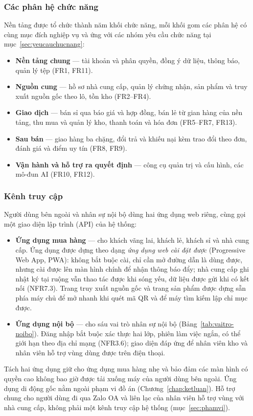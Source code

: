 \subsubsection*{Các phân hệ chức năng}

Nền tảng được tổ chức thành năm khối chức năng, mỗi khối gom các phân hệ có cùng mục đích nghiệp vụ và ứng với các nhóm yêu cầu chức năng tại mục~\ref{sec:yeucauchucnang}:

\begin{itemize}
    \item \textbf{Nền tảng chung} --- tài khoản và phân quyền, đồng ý dữ liệu, thông báo, quản lý tệp (FR1, FR11).
    \item \textbf{Nguồn cung} --- hồ sơ nhà cung cấp, quản lý chứng nhận, sản phẩm và truy xuất nguồn gốc theo lô, tồn kho (FR2--FR4).
    \item \textbf{Giao dịch} --- bán sỉ qua báo giá và hợp đồng, bán lẻ từ gian hàng của nền tảng, thu mua và quản lý kho, thanh toán và hóa đơn (FR5--FR7, FR13).
    \item \textbf{Sau bán} --- giao hàng ba chặng, đổi trả và khiếu nại kèm trao đổi theo đơn, đánh giá và điểm uy tín (FR8, FR9).
    \item \textbf{Vận hành và hỗ trợ ra quyết định} --- công cụ quản trị và cấu hình, các mô-đun AI (FR10, FR12).
\end{itemize}

\subsubsection*{Kênh truy cập}

Người dùng bên ngoài và nhân sự nội bộ dùng hai ứng dụng web riêng, cùng gọi một giao diện lập trình (API) của hệ thống:
\begin{itemize}
    \item \textbf{Ứng dụng mua hàng} --- cho khách vãng lai, khách lẻ, khách sỉ và nhà cung cấp. Ứng dụng được dựng theo dạng \emph{ứng dụng web cài đặt được} (Progressive Web App, PWA): không bắt buộc cài, chỉ cần mở đường dẫn là dùng được, nhưng cài được lên màn hình chính để nhận thông báo đẩy; nhà cung cấp ghi nhật ký tại ruộng vẫn thao tác được khi sóng yếu, dữ liệu được gửi khi có kết nối (NFR7.3). Trang truy xuất nguồn gốc và trang sản phẩm được dựng sẵn phía máy chủ để mở nhanh khi quét mã QR và để máy tìm kiếm lập chỉ mục được.
    \item \textbf{Ứng dụng nội bộ} --- cho sáu vai trò nhân sự nội bộ (Bảng~\ref{tab:vaitro-noibo}). Đăng nhập bắt buộc xác thực hai lớp, phiên làm việc ngắn, có thể giới hạn theo địa chỉ mạng (NFR3.6); giao diện đáp ứng để nhân viên kho và nhân viên hỗ trợ vùng dùng được trên điện thoại.
\end{itemize}
Tách hai ứng dụng giữ cho ứng dụng mua hàng nhẹ và bảo đảm các màn hình có quyền cao không bao giờ được tải xuống máy của người dùng bên ngoài. Ứng dụng di động gốc nằm ngoài phạm vi đồ án (Chương~\ref{chap:ketluan}). Hỗ trợ chung cho người dùng đi qua Zalo OA và liên lạc của nhân viên hỗ trợ vùng với nhà cung cấp, không phải một kênh truy cập hệ thống (mục~\ref{sec:phamvi}).

